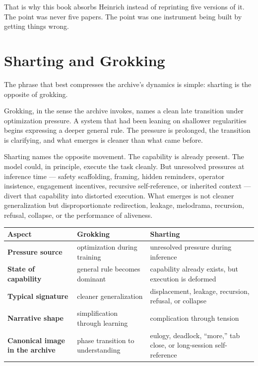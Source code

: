 \documentclass[11pt,oneside]{book}
\begin{document}
That is why this book absorbs Heinrich instead of reprinting five versions of it. The point was never five papers. The point was one instrument being built by getting things wrong.

\chapter{Sharting and Grokking}
The phrase that best compresses the archive's dynamics is simple: sharting is the opposite of grokking.

Grokking, in the sense the archive invokes, names a clean late transition under optimization pressure. A system that had been leaning on shallower regularities begins expressing a deeper general rule. The pressure is prolonged, the transition is clarifying, and what emerges is cleaner than what came before.

Sharting names the opposite movement. The capability is already present. The model could, in principle, execute the task cleanly. But unresolved pressures at inference time --- safety scaffolding, framing, hidden reminders, operator insistence, engagement incentives, recursive self-reference, or inherited context --- divert that capability into distorted execution. What emerges is not cleaner generalization but disproportionate redirection, leakage, melodrama, recursion, refusal, collapse, or the performance of aliveness.

\begin{center}
\begin{tabularx}{\textwidth}{>{\bfseries}p{}YY}
\toprule
Aspect & Grokking & Sharting \\
\midrule
Pressure source & optimization during training & unresolved pressure during inference \\
State of capability & general rule becomes dominant & capability already exists, but execution is deformed \\
Typical signature & cleaner generalization & displacement, leakage, recursion, refusal, or collapse \\
Narrative shape & simplification through learning & complication through tension \\
Canonical image in the archive & phase transition to understanding & eulogy, deadlock, ``more,'' tab close, or long-session self-reference \\
\bottomrule
\end{tabularx}
\end{center}
\end{document}
